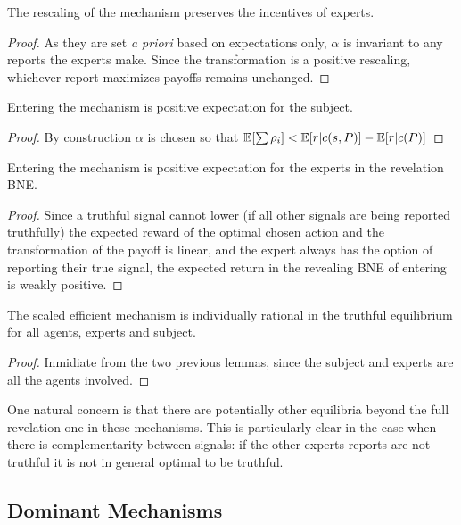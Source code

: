 \begin{lem}
	The rescaling of the mechanism preserves the incentives of experts.
\end{lem}

\begin{proof}
	As they are set \emph{a priori} based on expectations only, $\alpha$ is invariant to any reports the experts make. Since the transformation is a positive rescaling, whichever report maximizes payoffs remains unchanged. 
\end{proof}


\begin{lem}
	Entering the mechanism is positive expectation for the subject.
\end{lem}

\begin{proof}
  By construction $\alpha$ is chosen so that $\operatorname*{\mathbb E}[\sum \rho_i] < \operatorname*{\mathbb E}[r|c(s,P)] - \operatorname*{\mathbb E}[r|c(P)]$
\end{proof}


\begin{lem}
	Entering the mechanism is positive expectation for the experts in the revelation BNE.
\end{lem}

\begin{proof}
Since a truthful signal cannot lower (if all other signals are being reported truthfully) the expected reward of the optimal chosen action and the transformation of the payoff is linear, and the expert always has the option of reporting their true signal, the expected return in the revealing BNE of entering is weakly positive.
\end{proof}


\begin{thm}
	The scaled efficient mechanism is individually rational in the truthful equilibrium for all agents, experts and subject.
\end{thm}

\begin{proof}
Inmidiate from the two previous lemmas, since the subject and experts are all the agents involved.
\end{proof}

One natural concern is that there are potentially other equilibria beyond the full revelation one in these mechanisms. This is particularly clear in the case when there is complementarity between signals: if the other experts reports are not truthful it is not in general optimal to be truthful.


\subsection{Dominant Mechanisms}


